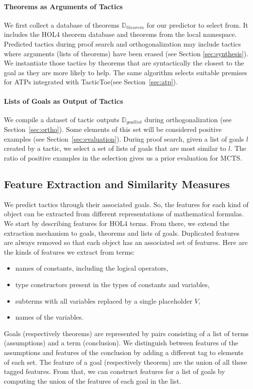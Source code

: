 \documentclass[runningheads,a4paper,draft]{svjour3}
\def\holfour{\textsf{HOL4}\xspace}
\def\tactictoe{\textsf{TacticToe}\xspace}
\begin{document}
\paragraph{Theorems as Arguments of Tactics}
We first collect a database of theorems $\mathbb{D}_{\mathit{theorem}}$ for our 
predictor to select from.
It includes the \holfour theorem database and theorems from the local namespace.
Predicted tactics during proof search and orthogonalization may include
tactics where arguments (lists of theorems) have been erased (see Section
\ref{sec:synthesis}).
We instantiate those tactics by theorems that are syntactically the closest to
the goal as they are more likely to help.
The same algorithm selects suitable premises for ATPs integrated with
\tactictoe (see Section~\ref{sec:atp}).

\paragraph{Lists of Goals as Output of Tactics}
We compile a dataset of tactic outputs $\mathbb{D}_{\mathit{goallist}}$ during 
orthogonalization (see
Section~\ref{sec:ortho}).
Some elements of this set will be considered positive examples (see
Section~\ref{sec:evaluation}).
During proof search, given a list of
goals $l$ created by a tactic, we select a set of lists of goals that are most
similar to $l$. The ratio of positive examples in the selection gives us a
prior evaluation for MCTS.

\subsection{Feature Extraction and Similarity Measures}\label{sec:features}

We predict tactics through their associated goals. So, the features
for each kind of object can be extracted from different representations of
mathematical formulas. We start by describing features for \holfour terms. From
there, we extend the extraction mechanism
to goals, theorems and lists of goals. Duplicated features are always removed
so that each object has an associated set of features.
Here are the kinds of features we extract from terms:
\begin{itemize}
\item names of constants, including the logical operators,
\item type constructors present in the types of constants and variables,
\item subterms with all variables replaced by a single placeholder $V$,
\item names of the variables.
\end{itemize}
Goals (respectively theorems) are represented by pairs consisting of a list of
terms (assumptions) and a term (conclusion). We distinguish between
features of the assumptions and features of the conclusion by adding a
different tag to elements of each set. The feature of a goal (respectively
theorem)
are the union of all these tagged features. From
that, we can construct features for a list of goals by computing the union of
the features of each goal in the list.
\end{document}
